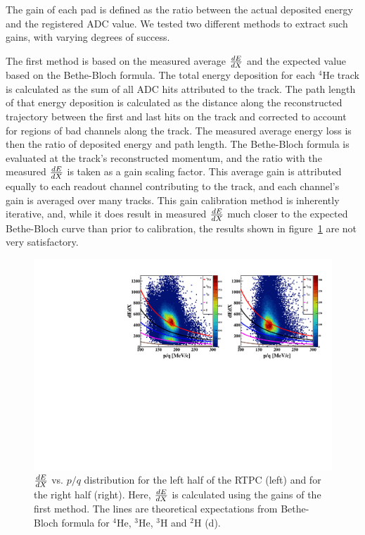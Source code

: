 \documentclass[twocolumn,showpacs,superscriptaddress,groupedaddress]{revtex4}
\begin{document}
The gain of each pad is defined as the ratio between the actual 
deposited energy and the registered ADC value. We tested two different 
methods to extract such gains, with varying degrees of success.

The first method is based on the measured average $\small{\frac{dE}{dX}}$
and the expected value based on the Bethe-Bloch formula. The total energy
deposition for each $^4$He track is calculated as the sum of all ADC hits
attributed to the track. The path length of that energy deposition is
calculated as the distance along the reconstructed trajectory between the first
and last hits on the track and corrected to account for regions
of bad channels along the track. The measured average energy loss is then the
ratio of deposited energy and path length. The Bethe-Bloch formula is
evaluated at the track's reconstructed momentum, and the ratio with the measured
$\small{\frac{dE}{dX}}$ is taken as a gain scaling factor. This average gain is
attributed equally to each readout channel contributing to the track, and each
channel's gain is averaged over many tracks. This gain calibration method is
inherently iterative, and, while it does result in measured $\small{\frac{dE}{dX}}$
much closer to the expected Bethe-Bloch curve than prior to calibration, the
results shown in figure~\ref{fig:dedx_p_exp_1st} are not very satisfactory.

\begin{figure}[tb]
   \centering
   \includegraphics[scale=0.45]{fig/f_dedx_p_exp_1st.pdf}
   \caption{$\small{\frac{dE}{dX}}$ vs. $p/q$ distribution for the left half of 
      the RTPC (left) and for the right half (right). Here, 
      $\small{\frac{dE}{dX}}$ is calculated using the gains of the first 
      method.  The lines are theoretical expectations from Bethe-Bloch formula 
   for $^4$He, $^3$He, $^3$H and $^2$H (d).}
\label{fig:dedx_p_exp_1st}
\end{figure}
\end{document}
